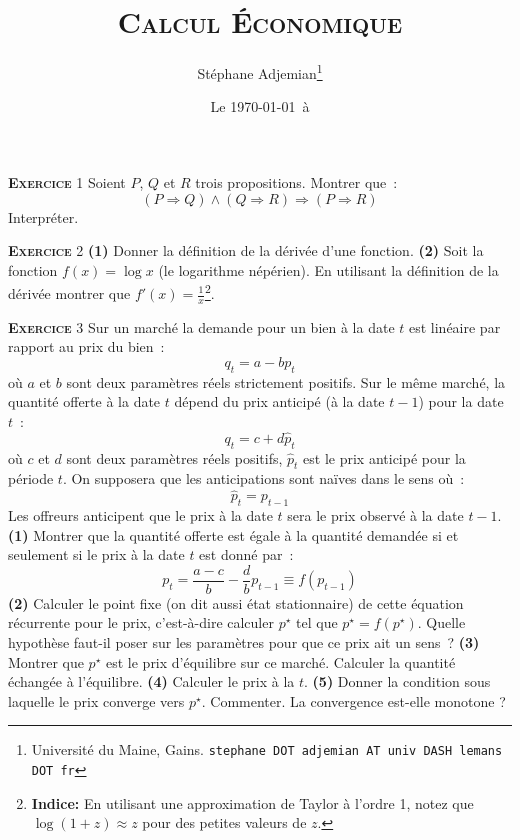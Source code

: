 \documentclass[10pt,a4paper,notitlepage]{article}
\newcommand{\exercice}[1]{\textsc{\textbf{Exercice}} #1}
\begin{document}
\title{\textsc{Calcul Économique}}
\author{Stéphane Adjemian\thanks{Université du Maine, Gains. \texttt{stephane DOT adjemian AT univ DASH lemans DOT fr}}}
\date{Le \today\ à \thistime}

\maketitle

\exercice{1} Soient $P$, $Q$ et $R$ trois propositions. Montrer que :
	\[
		(P \Rightarrow Q) \land (Q \Rightarrow R) \Rightarrow (P \Rightarrow R)
	\]
	Interpréter.
	
\bigskip

\exercice{2} \textbf{(1)} Donner la définition de la dérivée d'une
fonction. \textbf{(2)} Soit la fonction $f(x) = \log x$ (le logarithme népérien). En utilisant la définition de la dérivée montrer que $f'(x)=\frac{1}{x}$\footnote{\textbf{Indice:} En utilisant une approximation de Taylor à l'ordre 1, notez que $\log (1+z) \approx z$ pour des petites valeurs de $z$.}.

\bigskip

\exercice{3} Sur un marché la demande pour un bien à la date $t$ est linéaire par
rapport au prix du bien :
\[
q_t = a - b p_t
\]
où $a$ et $b$ sont deux paramètres réels strictement positifs. Sur le même marché,
la quantité offerte à la date $t$ dépend du prix anticipé (à la date
$t-1$) pour la date $t$ :
\[
q_t = c + d \hat p_t
\]
où $c$ et $d$ sont deux paramètres réels positifs, $\hat p_t$ est le
prix anticipé pour la période $t$. On supposera que les anticipations
sont naïves dans le sens où :
\[
\hat p_t = p_{t-1}
\]
Les offreurs anticipent que le prix à la date $t$ sera le prix observé
à la date $t-1$. \textbf{(1)} Montrer que la quantité offerte est
égale à la quantité demandée si et seulement si le prix à la date $t$
est donné par :
\[
p_t = \frac{a-c}{b} - \frac{d}{b} p_{t-1} \equiv f(p_{t-1})
\]
\textbf{(2)} Calculer le point fixe (on dit aussi état stationnaire)
de cette équation récurrente pour le prix, c'est-à-dire calculer
$p^{\star}$ tel que $p^{\star} = f(p^{\star})$. Quelle hypothèse
faut-il poser sur les paramètres pour que ce prix ait un sens ? \textbf{(3)}
Montrer que $p^{\star}$ est le prix d'équilibre sur ce
marché. Calculer la quantité échangée à l'équilibre. \textbf{(4)}
Calculer le prix à la $t$. \textbf{(5)} Donner la condition sous
laquelle le prix converge vers $p^{\star}$. Commenter. La convergence
est-elle monotone ?

\bigskip
\end{document}
